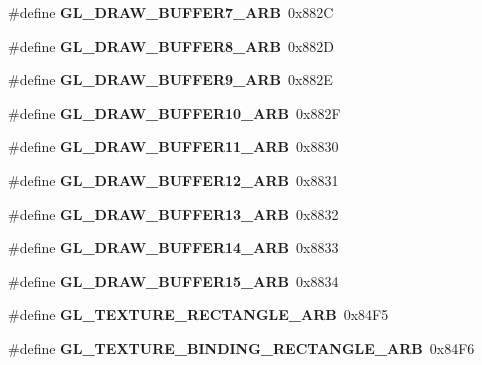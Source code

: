 \begin{DoxyCompactItemize}
\item 
\#define {\bfseries G\+L\+\_\+\+D\+R\+A\+W\+\_\+\+B\+U\+F\+F\+E\+R7\+\_\+\+A\+R\+B}~0x882\+C\label{_s_d_l__opengl_8h_ac24a3235fdbeace814538f0370d4c42f}

\item 
\#define {\bfseries G\+L\+\_\+\+D\+R\+A\+W\+\_\+\+B\+U\+F\+F\+E\+R8\+\_\+\+A\+R\+B}~0x882\+D\label{_s_d_l__opengl_8h_a7020c95bdbf5ec3ad6993945376a8824}

\item 
\#define {\bfseries G\+L\+\_\+\+D\+R\+A\+W\+\_\+\+B\+U\+F\+F\+E\+R9\+\_\+\+A\+R\+B}~0x882\+E\label{_s_d_l__opengl_8h_aa46c0e64a961e77ef54866406b05fdb3}

\item 
\#define {\bfseries G\+L\+\_\+\+D\+R\+A\+W\+\_\+\+B\+U\+F\+F\+E\+R10\+\_\+\+A\+R\+B}~0x882\+F\label{_s_d_l__opengl_8h_a8cd4f2ebe43c2cf24a5aa8d11d93a36a}

\item 
\#define {\bfseries G\+L\+\_\+\+D\+R\+A\+W\+\_\+\+B\+U\+F\+F\+E\+R11\+\_\+\+A\+R\+B}~0x8830\label{_s_d_l__opengl_8h_a6c9c2cbd6317d63c1fb479a3e752e529}

\item 
\#define {\bfseries G\+L\+\_\+\+D\+R\+A\+W\+\_\+\+B\+U\+F\+F\+E\+R12\+\_\+\+A\+R\+B}~0x8831\label{_s_d_l__opengl_8h_a88906c0176518b245214111f46f17bd8}

\item 
\#define {\bfseries G\+L\+\_\+\+D\+R\+A\+W\+\_\+\+B\+U\+F\+F\+E\+R13\+\_\+\+A\+R\+B}~0x8832\label{_s_d_l__opengl_8h_ad1e81301c78a1adfc534ce22458fb2b8}

\item 
\#define {\bfseries G\+L\+\_\+\+D\+R\+A\+W\+\_\+\+B\+U\+F\+F\+E\+R14\+\_\+\+A\+R\+B}~0x8833\label{_s_d_l__opengl_8h_a2ff5021b971080bbc2a7d4821d8c0c55}

\item 
\#define {\bfseries G\+L\+\_\+\+D\+R\+A\+W\+\_\+\+B\+U\+F\+F\+E\+R15\+\_\+\+A\+R\+B}~0x8834\label{_s_d_l__opengl_8h_a6e19c237d02eb7cda494756bfc8d9dde}

\item 
\#define {\bfseries G\+L\+\_\+\+T\+E\+X\+T\+U\+R\+E\+\_\+\+R\+E\+C\+T\+A\+N\+G\+L\+E\+\_\+\+A\+R\+B}~0x84\+F5\label{_s_d_l__opengl_8h_ac429f0ea5d9d2f9ea349cf825b4cb769}

\item 
\#define {\bfseries G\+L\+\_\+\+T\+E\+X\+T\+U\+R\+E\+\_\+\+B\+I\+N\+D\+I\+N\+G\+\_\+\+R\+E\+C\+T\+A\+N\+G\+L\+E\+\_\+\+A\+R\+B}~0x84\+F6\label{_s_d_l__opengl_8h_ad2212067630c4de4d365b1cdca38e6a3}


\end{DoxyCompactItemize}

